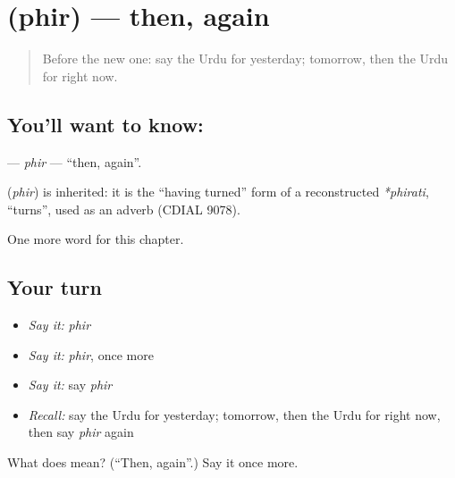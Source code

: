 \section[\texorpdfstring{\ur{پھر} (phir)}{پھر (phir)}]{ (phir) — then, again}

\label{lesson:UR-C76-phir}



\begin{quote}
Before the new one: say the Urdu for yesterday; tomorrow, then the Urdu for right now.
\end{quote}

\subsection*{You'll want to know: }
\textbf{} — \emph{phir} — \textquotedblleft{}then, again\textquotedblright{}.

\begin{cousinweb}
\textbf{} (\emph{phir}) is inherited: it is the \textquotedblleft{}having turned\textquotedblright{} form of a reconstructed \emph{*phirati}, \textquotedblleft{}turns\textquotedblright{}, used as an adverb (CDIAL 9078).
\end{cousinweb}

\begin{grammarlens}[title={What you've built}]
One more word for this chapter.
\end{grammarlens}

\subsection*{Your turn}
\begin{itemize}
\raggedright
  \item \emph{Say it:} \emph{phir}
  \item \emph{Say it:} \emph{phir}, once more
  \item \emph{Say it:} say \emph{phir}
  \item \emph{Recall:} say the Urdu for yesterday; tomorrow, then the Urdu for right now, then say \emph{phir} again
\end{itemize}

\begin{tcolorbox}[breakable,colback=teal!4,colframe=teal!35!black,title={Before you move on}]
What does  mean? (\textquotedblleft{}Then, again\textquotedblright{}.) Say it once more.
\end{tcolorbox}
